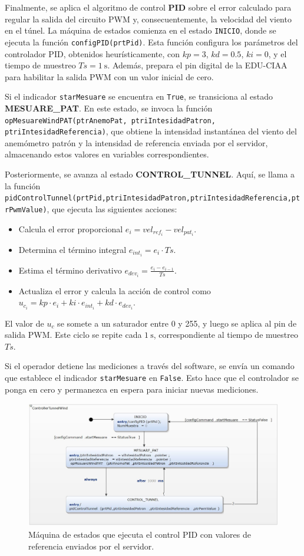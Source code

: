 Finalmente, se aplica el algoritmo de control \textbf{PID} sobre el error calculado para regular la salida del circuito PWM y, consecuentemente, la velocidad del viento en el túnel. La máquina de estados comienza en el estado \texttt{INICIO}, donde se ejecuta la función \texttt{configPID(prtPid)}. Esta función configura los parámetros del controlador PID, obtenidos heurísticamente, con $kp = 3$, $kd = 0.5$, $ki = 0$, y el tiempo de muestreo $Ts = \SI{1}{\second}$. Además, prepara el pin digital de la EDU-CIAA para habilitar la salida PWM con un valor inicial de cero.

Si el indicador \texttt{starMesuare} se encuentra en \texttt{True}, se transiciona al estado \textbf{MESUARE\_PAT}. En este estado, se invoca la función \texttt{opMesuareWindPAT(ptrAnemoPat, ptriIntesidadPatron, ptriIntesidadReferencia)}, que obtiene la intensidad instantánea del viento del anemómetro patrón y la intensidad de referencia enviada por el servidor, almacenando estos valores en variables correspondientes.

Posteriormente, se avanza al estado \textbf{CONTROL\_TUNNEL}. Aquí, se llama a la función \texttt{pidControlTunnel(prtPid,ptriIntesidadPatron,ptriIntesidadReferencia,ptrPwmValue)}, que ejecuta las siguientes acciones:
\begin{itemize}
    \item Calcula el error proporcional $e_{i} = vel_{ref_{i}} - vel_{pat_{i}}$.
    \item Determina el término integral $e_{int_{i}} = e_{i} \cdot Ts$.
    \item Estima el término derivativo $e_{dev_{i}} = \frac{e_{i} - e_{i-1}}{Ts}$.
    \item Actualiza el error y calcula la acción de control como $u_{c_{i}} = kp \cdot e_{i} + ki \cdot e_{int_{i}} + kd \cdot e_{dev_{i}}$.
\end{itemize}
El valor de $u_{c}$ se somete a un saturador entre 0 y 255, y luego se aplica al pin de salida PWM. Este ciclo se repite cada $\SI{1}{\second}$, correspondiente al tiempo de muestreo $Ts$.

Si el operador detiene las mediciones a través del software, se envía un comando que establece el indicador \texttt{starMesuare} en \texttt{False}. Esto hace que el controlador se ponga en cero y permanezca en espera para iniciar nuevas mediciones.

\begin{figure}[H]
    \centering
    \includegraphics[width=0.95\linewidth]{Figuras/datalogger/Firmware/pidControlTunel.jpg}
    \caption{Máquina de estados que ejecuta el control PID con valores de referencia enviados por el servidor.}
    \label{fig:pidControlTunel}
\end{figure}
